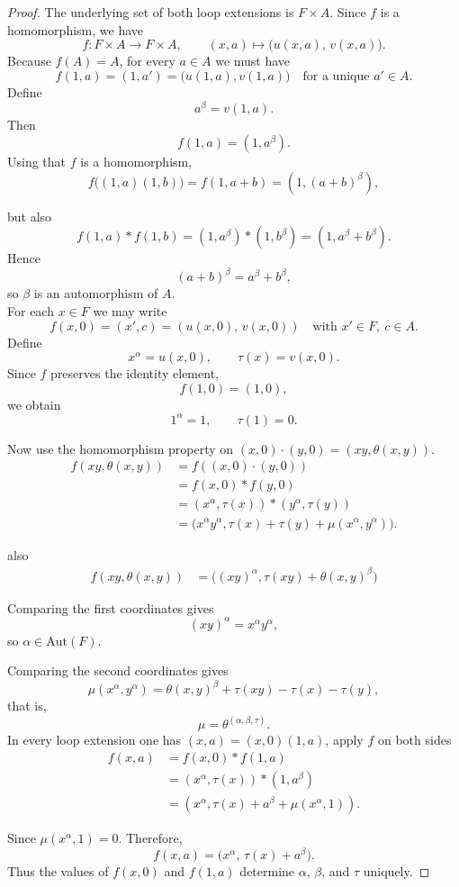 \documentclass[12pt,a4paper]{amsart}
\theoremstyle{definition}
\begin{document}
\begin{proof}
The underlying set of both loop extensions is $F\times A$. 
Since $f$ is a homomorphism, we have
\[
f:F\times A\longrightarrow F\times A,
\qquad
(x,a)\longmapsto\bigl(u(x,a),\,v(x,a)\bigr).
\]
Because $f(A)=A$, for every $a\in A$ we must have
\[
f(1,a)=(1,a')=\big(u(1,a),v(1,a)\big) \quad\text{for a unique }a'\in A.
\]
Define
\[
a^\beta=v(1,a).
\]
Then
\[
f(1,a)=(1,a^{\beta}).
\]
Using that $f$ is a homomorphism,
\[
f\bigl((1,a)(1,b)\bigr)
=
f(1,a+b)
=
(1,(a+b)^{\beta}),
\]

but also
\[
f(1,a)*f(1,b)=(1,a^{\beta})*(1,b^{\beta})
=(1,a^{\beta}+b^{\beta}).
\]
Hence
\[
(a+b)^{\beta}=a^{\beta}+b^{\beta},
\]
so $\beta$ is an automorphism of $A$.\\
For each $x\in F$ we may write
\[
f(x,0)=(x',c)=(u(x,0),\,v(x,0))
\quad\text{with }x'\in F,\ c\in A.
\]
Define
\[
x^\alpha=u(x,0),\qquad \tau(x)=v(x,0).
\]
Since $f$ preserves the identity element,
\[
f(1,0)=(1,0),
\]
we obtain
\[
1^\alpha=1,\qquad \tau(1)=0.
\]

Now use the homomorphism property on $(x,0)\cdot(y,0)=(xy,\theta(x,y))$.
\begin{align*}
f(xy,\theta(x,y)) &= f((x,0)\cdot(y,0))\\
&= f(x,0)*f(y,0)\\
&= (x^{\alpha},\tau(x))*(y^{\alpha},\tau(y))\\
&=\bigl(x^{\alpha}y^{\alpha},\tau(x)+\tau(y)+\mu(x^{\alpha},y^{\alpha})\bigr).
\end{align*}

also
\begin{align*}
f(xy,\theta(x,y)) &= \big((xy)^{\alpha},\tau(xy)+\theta(x,y)^{\beta}\big) 
\end{align*}


Comparing the first coordinates gives
\[
(xy)^{\alpha}=x^{\alpha}y^{\alpha},
\]
so $\alpha\in\mathrm{Aut}(F)$.

Comparing the second coordinates gives
\[
\mu(x^{\alpha},y^{\alpha})
=
\theta(x,y)^{\beta}
+\tau(xy)-\tau(x)-\tau(y),
\]
that is,
\[
\mu=\theta^{(\alpha,\beta,\tau)}.
\]
In every loop extension one has $(x,a)=(x,0)(1,a)$, apply $f$ on both sides
\begin{align*}
f(x,a)&=f(x,0)*f(1,a)\\
&=(x^{\alpha},\tau(x))*(1,a^{\beta})\\
&=(x^{\alpha},\tau(x)+a^{\beta}+\mu(x^{\alpha},1)).
\end{align*}

Since $\mu(x^{\alpha},1)=0$. Therefore,
\[
f(x,a)=\bigl(x^{\alpha},\,\tau(x)+a^{\beta}\bigr).
\]
Thus the values of $f(x,0)$ and $f(1,a)$ determine $\alpha$, $\beta$, and $\tau$ uniquely.
\end{proof}
\end{document}
